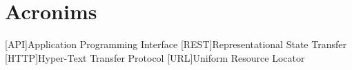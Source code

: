 \chapter{Acronims} 
\begin{acronym}

[API]{Application Programming Interface}
[REST]{Representational State Transfer}
[HTTP]{Hyper-Text Transfer Protocol}
[URL]{Uniform Resource Locator}

\end{acronym}
